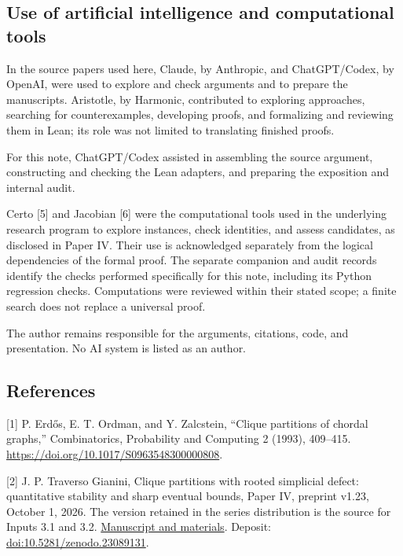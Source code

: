 \documentclass[english,11pt,a4paper]{article}
\begin{document}
\subsection{Use of artificial intelligence and computational
tools}\label{use-of-artificial-intelligence-and-computational-tools}

In the source papers used here, Claude, by Anthropic, and ChatGPT/Codex,
by OpenAI, were used to explore and check arguments and to prepare the
manuscripts. Aristotle, by Harmonic, contributed to exploring
approaches, searching for counterexamples, developing proofs, and
formalizing and reviewing them in Lean; its role was not limited to
translating finished proofs.

For this note, ChatGPT/Codex assisted in assembling the source argument,
constructing and checking the Lean adapters, and preparing the
exposition and internal audit.

\enlargethispage{2\baselineskip}Certo {[}5{]} and Jacobian {[}6{]} were the computational tools used in
the underlying research program to explore instances, check identities,
and assess candidates, as disclosed in Paper IV. Their use is
acknowledged separately from the logical dependencies of the formal
proof. The separate companion and audit records identify the checks
performed specifically for this note, including its Python regression
checks. Computations were reviewed within their stated scope; a finite
search does not replace a universal proof.

The author remains responsible for the arguments, citations, code, and
presentation. No AI system is listed as an author.

\subsection{References}\small\label{references}

{[}1{]} P. Erdős, E. T. Ordman, and Y. Zalcstein, ``Clique partitions of
chordal graphs,'' Combinatorics, Probability and Computing 2 (1993),
409--415. \url{https://doi.org/10.1017/S0963548300000808}.

{[}2{]} J. P. Traverso Gianini, Clique partitions with rooted simplicial
defect: quantitative stability and sharp eventual bounds, Paper IV,
preprint v1.23, October 1, 2026. The version retained in the series
distribution is the source for Inputs 3.1 and 3.2.
\href{https://github.com/jtraverso/erdos-81-chordal-clique-partitions/blob/054593443bdece587dda9686a411bb18b0ca34c5/preprints/PAPER_IV/01_manuscript/PAPER_IV_preprint_v1.23_en.md}{Manuscript
and materials}. Deposit:
\href{https://doi.org/10.5281/zenodo.23089131}{doi:10.5281/zenodo.23089131}.
\end{document}
